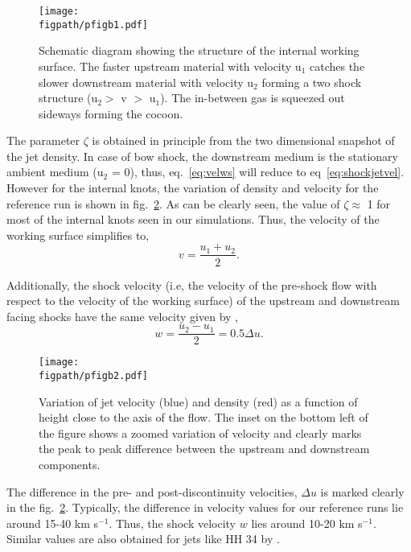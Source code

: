 \documentclass[useAMS,usenatbib]{mn2e}
\newcommand{\figpath}{/home/phybva/SiOJets_New/PAPER/NEWFIGS}
\begin{document}
\begin{figure}
\texttt{[image: \\figpath/pfigb1.pdf]}%
\caption{Schematic diagram showing the structure of the internal
  working surface. The faster upstream material with velocity u$_1$
  catches the slower downstream material with velocity u$_2$ forming a
two shock structure (u$_2 >$ v $>$ u$_1$). The in-between gas is squeezed out sideways
forming the cocoon.}
\label{fig:interknot}
\end{figure}

The parameter $\zeta$ is obtained in principle from the two
dimensional snapshot of the jet density. In case of bow shock, the
downstream medium is the stationary ambient medium (u$_2$ = 0), thus,
eq.~\ref{eq:velws} will reduce to eq~\ref{eq:shockjetvel}.
However for the internal knots, the variation of density and
velocity for the reference run is shown in fig.~\ref{fig:1dvelrho}.
As can be clearly seen, the value of $\zeta \approx$ 1 for most of the
internal knots seen in our simulations. Thus, the velocity of the
working surface simplifies to, 
\begin{equation}
v = \frac{u_1 + u_2}{2}.
\label{eq:velwssimple}
\end{equation}

Additionally, the shock velocity (i.e, the velocity of the pre-shock
flow with respect to the velocity of the working surface) of the
upstream and downstream facing shocks have the same velocity given by \cite{Raga:1990p16416},
\begin{equation}
w = \frac{u_2 - u_1}{2} = 0.5\Delta u.
\label{eq:shkvelws}
\end{equation}

\begin{figure}
\texttt{[image: \\figpath/pfigb2.pdf]}%
\caption{Variation of jet velocity (blue) and density (red) as a
  function of height close to the axis of the flow. The inset on the
  bottom left of the figure shows a zoomed variation of velocity and
  clearly marks the peak to peak difference between the upstream and
  downstream components.}
\label{fig:1dvelrho}
\end{figure}


The difference in the pre- and post-discontinuity velocities, $\Delta
u$ is marked clearly in the fig.~\ref{fig:1dvelrho}. Typically, the
difference in velocity values for our reference runs lie around 15-40 km s$^{-1}$. Thus, the
shock velocity $w$ lies around 10-20 km s$^{-1}$. Similar values are
also obtained for jets like HH 34 by \cite{Raga:1992p16392}.
\end{document}
